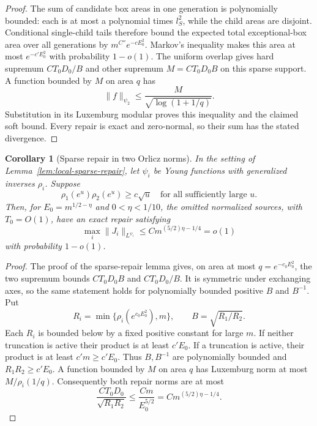 \documentclass[11pt]{article}
\newtheorem{corollary}[theorem]{Corollary}
\numberwithin{equation}{section}
\begin{document}
\begin{proof}
The sum of candidate box areas in one generation is polynomially
bounded: each is at most a polynomial times $l_S^2$, while the child
areas are disjoint. Conditional single-child tails therefore bound the
expected total exceptional-box area over all generations by
$m^{C''}e^{-cE_0^2}$. Markov's inequality makes this area at most
$e^{-c'E_0^2}$ with probability $1-o(1)$. The uniform overlap gives
hard supremum $CT_0D_0/B$ and other supremum $M=CT_0D_0B$ on this
sparse support. A function bounded by $M$ on area $q$ has
\[
 \|f\|_{\psi_2}\le\frac{M}{\sqrt{\log(1+1/q)}}.
\]
Substitution in its Luxemburg modular proves this inequality and the
claimed soft bound. Every repair is exact and zero-normal, so their
sum has the stated divergence.
\end{proof}

\begin{corollary}[Sparse repair in two Orlicz norms]
\label{lem:local-sparse-orlicz}
In the setting of Lemma~\ref{lem:local-sparse-repair}, let $\psi_i$ be
Young functions with generalized inverses $\rho_i$. Suppose
\[
 \rho_1(e^u)\rho_2(e^u)\ge c\sqrt u
 \quad\text{for all sufficiently large }u.
\]
Then, for $E_0=m^{1/2-\eta}$ and $0<\eta<1/10$, the omitted normalized
sources, with $T_0=O(1)$, have an exact repair satisfying
\[
 \max_i\|J_i\|_{L^{\psi_i}}
 \le C m^{(5/2)\eta-1/4}=o(1)
\]
with probability $1-o(1)$.
\end{corollary}
\begin{proof}
The proof of the sparse-repair lemma gives, on area at most
$q=e^{-c_0E_0^2}$, the two supremum bounds
$CT_0D_0B$ and $CT_0D_0/B$. It is symmetric under exchanging axes,
so the same statement holds for polynomially bounded positive $B$ and
$B^{-1}$. Put
\[
 R_i=\min\{\rho_i(e^{c_0E_0^2}),m\},\qquad
 B=\sqrt{R_1/R_2}.
\]
Each $R_i$ is bounded below by a fixed positive constant for large $m$.
If neither truncation is active their product is at least $c'E_0$.
If a truncation is active, their product is at least $c'm\ge c'E_0$.
Thus $B,B^{-1}$ are polynomially bounded and $R_1R_2\ge c'E_0$.
A function bounded by $M$ on area $q$ has Luxemburg norm at most
$M/\rho_i(1/q)$. Consequently both repair norms are at most
\[
 \frac{CT_0D_0}{\sqrt{R_1R_2}}
 \le\frac{Cm}{E_0^{5/2}}
 =Cm^{(5/2)\eta-1/4}.
\]
\end{proof}
\end{document}
